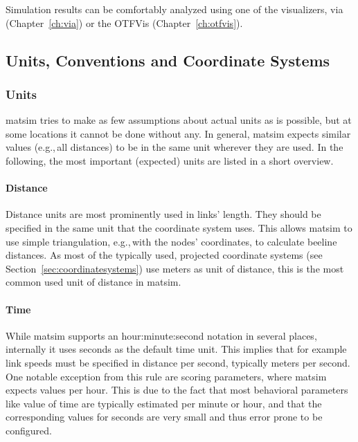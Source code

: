 Simulation results can be comfortably analyzed using one of the visualizers, via (Chapter~\ref{ch:via}) or the OTFVis (Chapter~\ref{ch:otfvis}).

\subsection{Units, Conventions and Coordinate Systems}
\label{sec:unitsconventions}
\subsubsection{Units}
\gls{matsim} tries to make as few assumptions about actual units as is possible, but at some locations it cannot be done without any. In general, \gls{matsim} expects similar values (e.g.,\,all distances) to be in the same unit wherever they are used. In the following, the most important (expected) units are listed in a short overview. 

\paragraph{Distance}

Distance units are most prominently used in links' length. They should be specified in the same unit that the coordinate system uses. This allows \gls{matsim} to use simple triangulation, e.g.,\,with the nodes' coordinates, to calculate beeline distances. As most of the typically used, projected coordinate systems (see Section~\ref{sec:coordinatesystems}) use meters as unit of distance, this is the most common used unit of distance in \gls{matsim}. 

\paragraph{Time}

While \gls{matsim} supports an hour:minute:second notation in several places, internally it uses seconds as the default time unit. This implies that for example link speeds must be specified in distance per second, typically meters per second. One notable exception from this rule are scoring parameters, where \gls{matsim} expects values per hour. This is due to the fact that most behavioral parameters like value of time are typically estimated per minute or hour, and that the corresponding values for seconds are very small and thus error prone to be configured. 

